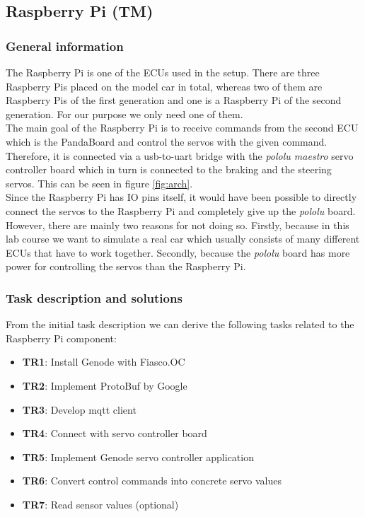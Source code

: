 \subsection{Raspberry Pi (TM)}
\label{sec:rpi}

\subsubsection{General information}
The Raspberry Pi is one of the ECUs used in the setup. There are three Raspberry Pis placed on the model car in total, whereas two of them are Raspberry Pis of the first generation and one is a Raspberry Pi of the second generation. For our purpose we only need one of them. \\

The main goal of the Raspberry Pi is to receive commands from the second ECU which is the PandaBoard and control the servos with the given command. Therefore, it is connected via a usb-to-uart bridge with the \textit{pololu maestro} servo controller board which in turn is connected to the braking and the steering servos. This can be seen in figure \ref{fig:arch}. \\

Since the Raspberry Pi has IO pins itself, it would have been possible to directly connect the servos to the Raspberry Pi and completely give up the \textit{pololu} board. However, there are mainly two reasons for not doing so. Firstly, because in this lab course we want to simulate a real car which usually consists of many different ECUs that have to work together. Secondly, because the \textit{pololu} board has more power for controlling the servos than the Raspberry Pi. 


\subsubsection{Task description and solutions}
\label{sec:rpi-req}
From the initial task description we can derive the following tasks related to the Raspberry Pi component:

\begin{itemize}
    \item \textbf{TR1}: Install Genode with Fiasco.OC
    \item \textbf{TR2}: Implement ProtoBuf by Google
    \item \textbf{TR3}: Develop mqtt client
    \item \textbf{TR4}: Connect with servo controller board
    \item \textbf{TR5}: Implement Genode servo controller application
    \item \textbf{TR6}: Convert control commands into concrete servo values
    \item \textbf{TR7}: Read sensor values (optional)
\end{itemize}

